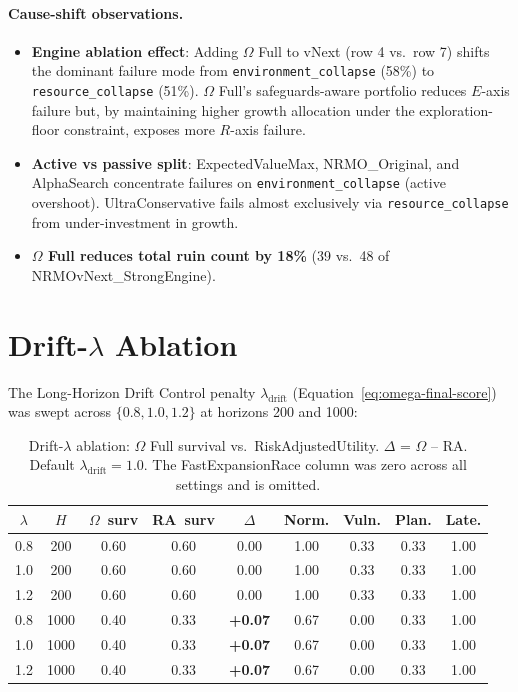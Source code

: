 \paragraph{Cause-shift observations.}

\begin{itemize}
\item \textbf{Engine ablation effect}: Adding $\Omega$ Full to
vNext (row 4 vs.~row 7) shifts the dominant failure mode from
\texttt{environment\_collapse} (58\%) to \texttt{resource\_collapse}
(51\%). $\Omega$ Full's safeguards-aware portfolio reduces $E$-axis
failure but, by maintaining higher growth allocation under the
exploration-floor constraint, exposes more $R$-axis failure.
\item \textbf{Active vs passive split}: ExpectedValueMax,
NRMO\_Original, and AlphaSearch concentrate failures on
\texttt{environment\_collapse} (active overshoot). UltraConservative
fails almost exclusively via \texttt{resource\_collapse} from
under-investment in growth.
\item \textbf{$\Omega$ Full reduces total ruin count by 18\%}
(39 vs.~48 of NRMOvNext\_StrongEngine).
\end{itemize}

\clearpage
\section{Drift-$\lambda$ Ablation}
\label{sec:empirical-drift-ablation}

The Long-Horizon Drift Control penalty $\lambda_{\mathrm{drift}}$
(Equation~\ref{eq:omega-final-score}) was swept across $\{0.8, 1.0,
1.2\}$ at horizons 200 and 1000:

\begin{table}[ht]
\centering
\small
\begin{tabularx}{\linewidth}{ccccccccc}
\toprule
$\lambda$ & $H$ & $\Omega$~surv & RA~surv & $\Delta$ &
\textbf{Norm.} & \textbf{Vuln.} & \textbf{Plan.} & \textbf{Late.} \\
\midrule
0.8 & 200  & 0.60 & 0.60 & 0.00 & 1.00 & 0.33 & 0.33 & 1.00 \\
1.0 & 200  & 0.60 & 0.60 & 0.00 & 1.00 & 0.33 & 0.33 & 1.00 \\
1.2 & 200  & 0.60 & 0.60 & 0.00 & 1.00 & 0.33 & 0.33 & 1.00 \\
0.8 & 1000 & 0.40 & 0.33 & \textbf{+0.07} & 0.67 & 0.00 & 0.33 & 1.00 \\
1.0 & 1000 & 0.40 & 0.33 & \textbf{+0.07} & 0.67 & 0.00 & 0.33 & 1.00 \\
1.2 & 1000 & 0.40 & 0.33 & \textbf{+0.07} & 0.67 & 0.00 & 0.33 & 1.00 \\
\bottomrule
\end{tabularx}
\caption[Drift-$\lambda$ ablation]{Drift-$\lambda$ ablation:
$\Omega$ Full survival vs.~RiskAdjustedUtility. $\Delta$ =
$\Omega$ -- RA. Default $\lambda_{\mathrm{drift}} = 1.0$. The
FastExpansionRace column was zero across all settings and is
omitted.}
\label{tab:empirical-drift-ablation}
\end{table}

